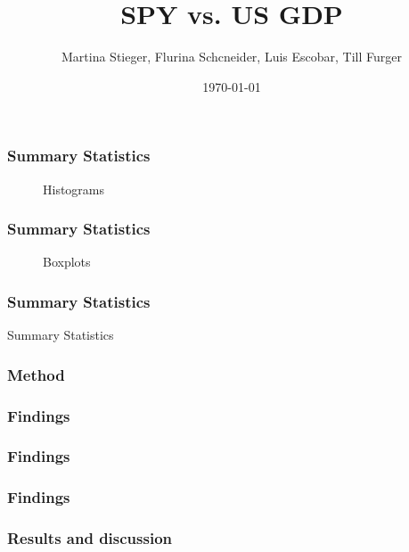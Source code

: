 \documentclass{beamer}
\title{SPY vs. US GDP}
\author{Martina Stieger, Flurina Schcneider,  \newline Luis Escobar, Till Furger }
\institute{}
\date{\today}
\begin{document}
\frame{\titlepage}

\begin{frame}
\frametitle{Summary Statistics}
\begin{figure}[htbp]
	\centering
	
	\caption{Histograms}
\end{figure}

\end{frame}

\begin{frame}
\frametitle{Summary Statistics}
\begin{figure}[htbp]
	\centering
	
	\caption{Boxplots}
\end{figure}

\end{frame}


\begin{frame}
\frametitle{Summary Statistics}

\begin{table}[H]
	
	\caption{Summary Statistics}
\end{table}

\end{frame}

\begin{frame}
\frametitle{Method}

\end{frame}

\begin{frame}
\frametitle{Findings}

\begin{figure}[htbp]
	\centering
	
	\caption{}
\end{figure}

\end{frame}

\begin{frame}
\frametitle{Findings}

\begin{figure}[htbp]
	\centering
	
	\caption{}
\end{figure}

\end{frame}

\begin{frame}
\frametitle{Findings}

\begin{figure}[htbp]
	\centering
	
	\caption{}
\end{figure}

\end{frame}

\begin{frame}
\frametitle{Results and discussion}

\end{frame}
\end{document}
